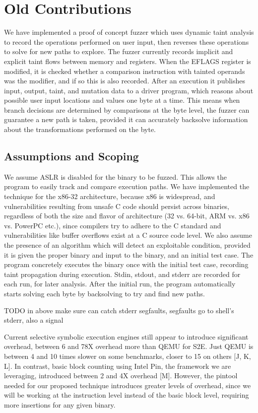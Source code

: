 \documentclass[11pt,expanded,copyright]{fsuthesis}
\begin{document}
\chapter{Old Contributions}


We have implemented a proof of concept fuzzer which uses dynamic taint analysis to record the operations performed on user input, then reverses these operations to solve for new paths to explore. The fuzzer currently records implicit and explicit taint flows between memory and registers. When the EFLAGS register is modified, it is checked whether a comparison instruction with tainted operands was the modifier, and if so this is also recorded. After an execution it publishes input, output, taint, and mutation data to a driver program, which reasons about possible user input locations and values one byte at a time. This means when branch decisions are determined by comparisons at the byte level, the fuzzer can guarantee a new path is taken, provided it can accurately backsolve information about the transformations performed on the byte.

\section{Assumptions and Scoping}

We assume ASLR is disabled for the binary to be fuzzed. This allows the program to easily track and compare execution paths. We have implemented the technique for the x86-32 architecture, because x86 is widespread, and vulnerabilities resulting from unsafe C code should persist across binaries, regardless of both the size and flavor of architecture (32 vs. 64-bit, ARM vs. x86 vs. PowerPC etc.), since compilers try to adhere to the C standard and vulnerabilities like buffer overflows exist at a C source code level. We also assume the presence of an algorithm which will detect an exploitable condition, provided it is given the proper binary and input to the binary, and an initial test case. The program concretely executes the binary once with the initial test case, recording taint propagation during execution. Stdin, stdout, and stderr are recorded for each run, for later analysis. After the initial run, the program automatically starts solving each byte by backsolving to try and find new paths.

TODO in above make sure can catch stderr segfaults, segfaults go to shell's stderr, also a signal

Current selective symbolic execution engines still appear to introduce significant overhead, between 6 and 78X overhead more than QEMU for S2E. Just QEMU is between 4 and 10 times slower on some benchmarks, closer to 15 on others [J, K, L]. In contrast, basic block counting using Intel Pin, the framework we are leveraging, introduced between 2 and 4X overhead [M]. However, the pintool needed for our proposed technique introduces greater levels of overhead, since we will be working at the instruction level instead of the basic block level, requiring more insertions for any given binary.
\end{document}
